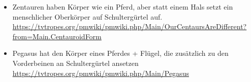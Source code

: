 \begin{itemize}
 \item Zentauren haben Körper wie ein Pferd, aber statt einem Hals setzt ein menschlicher Oberkörper auf Schultergürtel auf.\\
 \url{https://tvtropes.org/pmwiki/pmwiki.php/Main/OurCentaursAreDifferent?from=Main.CentauroidForm}
 \item Pegasus hat den Körper eines Pferdes + Flügel, die zusätzlich zu den Vorderbeinen an Schultergürtel ansetzen\\
 \url{https://tvtropes.org/pmwiki/pmwiki.php/Main/Pegasus}
\end{itemize}

